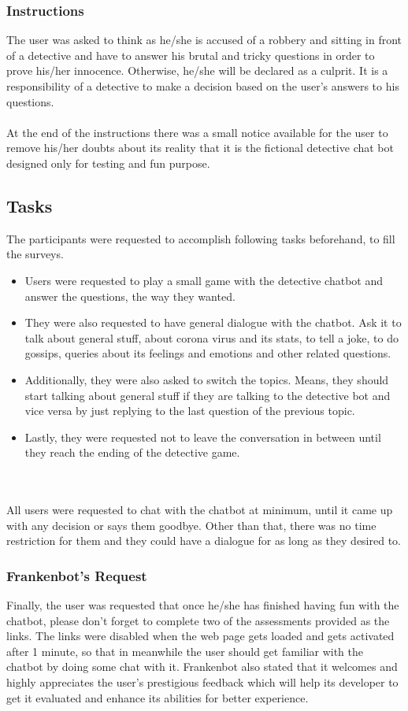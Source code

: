 \subsubsection*{Instructions}
The user was asked to think as he/she is accused of a robbery and sitting in front of a detective and have to answer his brutal and tricky questions in order to prove his/her innocence. Otherwise, he/she will be declared as a culprit. It is a responsibility of a detective to make a decision based on the user's answers to his questions.
\\~\\
At the end of the instructions there was a small notice available for the user to remove his/her doubts about its reality that it is the fictional detective chat bot designed only for testing and fun purpose.

\subsection{Tasks}
The participants were requested to accomplish following tasks beforehand, to fill the surveys.
\begin{itemize}
    \item Users were requested to play a small game with the detective chatbot and answer the questions, the way they wanted.
    \item They were also requested to have general dialogue with the chatbot. Ask it to talk about general stuff, about corona virus and its stats, to tell a joke, to do gossips, queries about its feelings and emotions and other related questions.
    \item Additionally, they were also asked to switch the topics. Means, they should start talking about general stuff if they are talking to the detective bot and vice versa by just replying to the last question of the previous topic.
    \item Lastly, they were requested not to leave the conversation in between until they reach the ending of the detective game. 
\end{itemize} 
\\~\\
All users were requested to chat with the chatbot at minimum, until it came up with any decision or says them goodbye. Other than that, there was no time restriction for them and they could have a dialogue for as long as they desired to.

\subsubsection*{Frankenbot's Request}
Finally, the user was requested that once he/she has finished having fun with the chatbot, please don't forget to complete two of the assessments provided as the links. The links were disabled when the web page gets loaded and gets activated after 1 minute, so that in meanwhile the user should get familiar with the chatbot by doing some chat with it. Frankenbot also stated that it welcomes and highly appreciates the user's prestigious feedback which will help its developer to get it evaluated and enhance its abilities for better experience.

